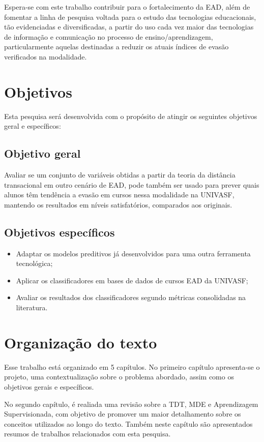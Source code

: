 Espera-se com este trabalho contribuir para o fortalecimento da EAD, além de
fomentar a linha de pesquisa voltada para o estudo das tecnologias educacionais,
tão evidenciadas e diversificadas, a partir do uso cada vez maior das
tecnologias de informação e comunicação no processo de ensino/aprendizagem,
particularmente aquelas destinadas a reduzir os atuais índices de evasão
verificados na modalidade.

\section{Objetivos}

Esta pesquisa será desenvolvida com o propósito de atingir os seguintes
objetivos geral e específicos:

\subsection{Objetivo geral}

Avaliar se um conjunto de variáveis obtidas a partir da teoria da distância
transacional em outro cenário de EAD, pode também ser usado para prever quais
alunos têm tendência a evasão em cursos nessa modalidade na UNIVASF, mantendo os
resultados em níveis satisfatórios, comparados aos originais.

\subsection{Objetivos específicos}
\begin{itemize}
  \item Adaptar os modelos preditivos já desenvolvidos para uma outra ferramenta
  tecnológica;
  \item Aplicar os classificadores em bases de dados de cursos EAD da UNIVASF;
  \item Avaliar os resultados dos classificadores segundo métricas consolidadas
  na literatura.
\end{itemize}

\section{Organização do texto}

Esse trabalho está organizado em 5 capítulos. No primeiro capítulo apresenta-se
o projeto, uma contextualização sobre o problema abordado, assim como os
objetivos gerais e específicos.

No segundo capítulo, é realiada uma revisão sobre a TDT, MDE e Aprendizagem
Supervisionada, com objetivo de promover um maior detalhamento sobre os
conceitos utilizados ao longo do texto. Também neste capítulo são apresentados
resumos de trabalhos relacionados com esta pesquisa.

